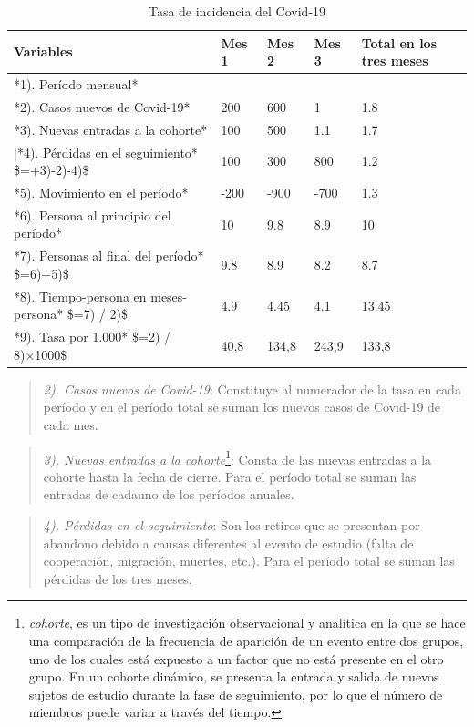 \documentclass[
]{book}
\begin{document}
\begin{table}

\caption{\label{tab:covid}Tasa de incidencia del Covid-19}
\centering
\begin{tabular}[t]{l|l|l|l|l}
\hline
Variables & Mes 1 & Mes 2 & Mes 3 & Total en los tres meses \\
\hline
*1). Período mensual* &  &  &  & \\
\hline
*2). Casos nuevos de Covid-19* & 200 & 600 & 1 & 1.8\\
\hline
*3). Nuevas entradas a la cohorte* & 100 & 500 & 1.1 & 1.7\\
\hline
|*4). Pérdidas en el seguimiento* \$=+3)-2)-4)\$ & 100 & 300 & 800 & 1.2\\
\hline
*5). Movimiento en el período* & -200 & -900 & -700 & 1.3\\
\hline
*6). Persona al principio del período* & 10 & 9.8 & 8.9 & 10\\
\hline
*7). Personas al final del período* \$=6)+5)\$ & 9.8 & 8.9 & 8.2 & 8.7\\
\hline
*8). Tiempo-persona en meses-persona*  \$=7) / 2)\$ & 4.9 & 4.45 & 4.1 & 13.45\\
\hline
*9). Tasa por 1.000* \$=2) / 8)×1000\$ & 40,8 & 134,8 & 243,9 & 133,8\\
\hline
\end{tabular}
\end{table}

\begin{quote}
\emph{2). Casos nuevos de Covid-19}: Constituye al numerador de la tasa en cada período y en el período total se suman los nuevos casos de Covid-19 de cada mes.
\end{quote}

\begin{quote}
\emph{3). Nuevas entradas a la cohorte}\footnote{\emph{cohorte}, es un tipo de investigación observacional y analítica en la que se hace una comparación de la frecuencia de aparición de un evento entre dos grupos, uno de los cuales está expuesto a un factor que no está presente en el otro grupo. En un cohorte dinámico, se presenta la entrada y salida de nuevos sujetos de estudio durante la fase de seguimiento, por lo que el número de miembros puede variar a través del tiempo.}: Consta de las nuevas entradas a la
cohorte hasta la fecha de cierre. Para el período total se suman las entradas de cadauno de los períodos anuales.
\end{quote}

\begin{quote}
\emph{4). Pérdidas en el seguimiento}: Son los retiros que se presentan por abandono debido a causas diferentes al evento de estudio (falta de cooperación, migración, muertes, etc.). Para el período total se suman las pérdidas de los tres meses.
\end{quote}
\end{document}
